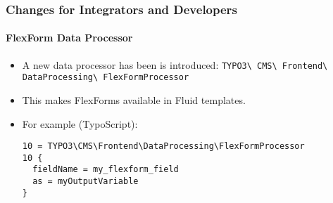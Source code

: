 %

\begin{frame}[fragile]
	\frametitle{Changes for Integrators and Developers}
	\framesubtitle{FlexForm Data Processor}


	\begin{itemize}
		\item A new data processor has been is introduced:\newline
			\small\texttt{TYPO3\textbackslash
				CMS\textbackslash
				Frontend\textbackslash
				DataProcessing\textbackslash
				FlexFormProcessor}\normalsize
		\item This makes FlexForms available in Fluid templates.
		\item For example (TypoScript):
\begin{lstlisting}
10 = TYPO3\CMS\Frontend\DataProcessing\FlexFormProcessor
10 {
  fieldName = my_flexform_field
  as = myOutputVariable
}\end{lstlisting}

	\end{itemize}

\end{frame}


